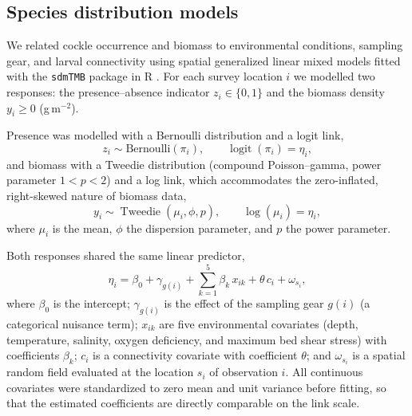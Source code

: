 
\subsection{Species distribution models}

We related cockle occurrence and biomass to environmental conditions, sampling
gear, and larval connectivity using spatial generalized linear mixed models
fitted with the \texttt{sdmTMB} package \citep{anderson2024} in \textsf{R}
\citep{rcore}. For each survey location $i$ we modelled two responses: the
presence--absence indicator $z_i\in\{0,1\}$ and the biomass density
$y_i\ge 0$ (g\,m$^{-2}$).

Presence was modelled with a Bernoulli distribution and a logit link,
\begin{equation}
z_i \sim \mathrm{Bernoulli}(\pi_i),
\qquad
\operatorname{logit}(\pi_i) = \eta_i ,
\end{equation}
and biomass with a Tweedie distribution (compound Poisson--gamma, power
parameter $1<p<2$) and a log link, which accommodates the zero-inflated,
right-skewed nature of biomass data,
\begin{equation}
y_i \sim \operatorname{Tweedie}(\mu_i,\phi,p),
\qquad
\log(\mu_i) = \eta_i ,
\end{equation}
where $\mu_i$ is the mean, $\phi$ the dispersion parameter, and $p$ the power
parameter.

Both responses shared the same linear predictor,
\begin{equation}
\eta_i = \beta_0 + \gamma_{g(i)}
      + \sum_{k=1}^{5}\beta_k\,x_{ik}
      + \theta\,c_i
      + \omega_{s_i},
\label{eq:linpred}
\end{equation}
where $\beta_0$ is the intercept; $\gamma_{g(i)}$ is the effect of the sampling
gear $g(i)$ (a categorical nuisance term); $x_{ik}$ are five environmental
covariates (depth, temperature, salinity, oxygen deficiency, and maximum bed
shear stress) with coefficients $\beta_k$; $c_i$ is a connectivity covariate
with coefficient $\theta$; and $\omega_{s_i}$ is a spatial random field
evaluated at the location $s_i$ of observation $i$. All continuous covariates
were standardized to zero mean and unit variance before fitting, so that the
estimated coefficients are directly comparable on the link scale.

